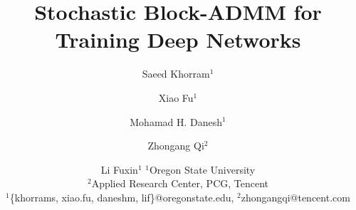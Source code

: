 \documentclass{article}
\title{Stochastic Block-ADMM for Training Deep Networks}
\author{
Saeed Khorram$^1$
\and
Xiao Fu$^1$\and
Mohamad H. Danesh$^{1}$\and
Zhongang Qi$^2$\and
Li Fuxin$^1$
\affiliations
$^1$Oregon State University\\
$^2$Applied Research Center, PCG, Tencent \\
\emails
$^1$\{khorrams, xiao.fu, daneshm, lif\}@oregonstate.edu,
$^2$zhongangqi@tencent.com
}
\begin{document}
\maketitle














{\small

}

\clearpage

% 
\end{document}

